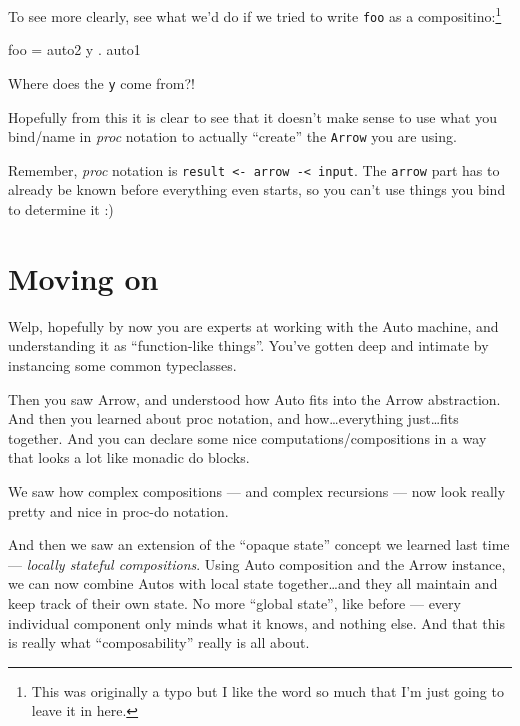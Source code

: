 \documentclass[]{article}
\newenvironment{Shaded}{}{}
\newcommand{\FunctionTok}[1]{\textcolor[rgb]{0.02,0.16,0.49}{{#1}}}
\newcommand{\NormalTok}[1]{{#1}}
\begin{document}
To see more clearly, see what we'd do if we tried to write \texttt{foo}
as a compositino:\footnote{This was originally a typo but I like the
  word so much that I'm just going to leave it in here.}

\begin{Shaded}
\begin{Highlighting}[]
\NormalTok{foo }\FunctionTok{=} \NormalTok{auto2 y }\FunctionTok{.} \NormalTok{auto1}
\end{Highlighting}
\end{Shaded}

Where does the \texttt{y} come from?!

Hopefully from this it is clear to see that it doesn't make sense to use
what you bind/name in \emph{proc} notation to actually ``create'' the
\texttt{Arrow} you are using.

Remember, \emph{proc} notation is
\texttt{result\ \textless{}-\ arrow\ -\textless{}\ input}. The
\texttt{arrow} part has to already be known before everything even
starts, so you can't use things you bind to determine it :)

\section{Moving on}\label{moving-on}

Welp, hopefully by now you are experts at working with the Auto machine,
and understanding it as ``function-like things''. You've gotten deep and
intimate by instancing some common typeclasses.

Then you saw Arrow, and understood how Auto fits into the Arrow
abstraction. And then you learned about proc notation, and
how\ldots{}everything just\ldots{}fits together. And you can declare
some nice computations/compositions in a way that looks a lot like
monadic do blocks.

We saw how complex compositions --- and complex recursions --- now look
really pretty and nice in proc-do notation.

And then we saw an extension of the ``opaque state'' concept we learned
last time --- \emph{locally stateful compositions}. Using Auto
composition and the Arrow instance, we can now combine Autos with local
state together\ldots{}and they all maintain and keep track of their own
state. No more ``global state'', like before --- every individual
component only minds what it knows, and nothing else. And that this is
really what ``composability'' really is all about.
\end{document}
